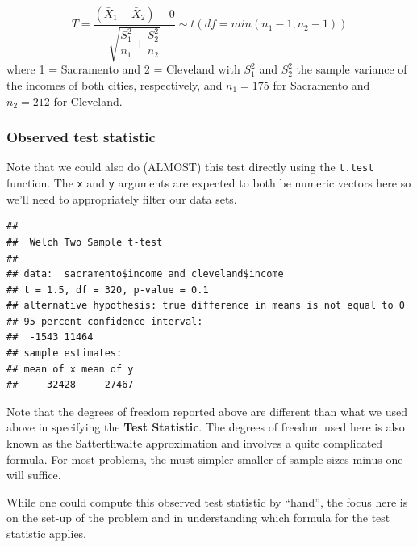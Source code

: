 \documentclass[]{tufte-book}
\newenvironment{Shaded}{\begin{snugshade}}{\end{snugshade}}
\newcommand{\KeywordTok}[1]{\textcolor[rgb]{0.13,0.29,0.53}{\textbf{{#1}}}}
\newcommand{\DataTypeTok}[1]{\textcolor[rgb]{0.13,0.29,0.53}{{#1}}}
\newcommand{\StringTok}[1]{\textcolor[rgb]{0.31,0.60,0.02}{{#1}}}
\newcommand{\NormalTok}[1]{{#1}}
\begin{document}
\[ T =\dfrac{ (\bar{X}_1 - \bar{X}_2) - 0}{ \sqrt{\dfrac{S_1^2}{n_1} + \dfrac{S_2^2}{n_2}}  } \sim t (df = min(n_1 - 1, n_2 - 1)) \]
where 1 = Sacramento and 2 = Cleveland with \(S_1^2\) and \(S_2^2\) the
sample variance of the incomes of both cities, respectively, and
\(n_1 = 175\) for Sacramento and \(n_2 = 212\) for Cleveland.

\subsubsection{Observed test statistic}\label{observed-test-statistic-3}

Note that we could also do (ALMOST) this test directly using the
\texttt{t.test} function. The \texttt{x} and \texttt{y} arguments are
expected to both be numeric vectors here so we'll need to appropriately
filter our data sets.

\begin{Shaded}
\end{Shaded}

\begin{verbatim}
## 
##  Welch Two Sample t-test
## 
## data:  sacramento$income and cleveland$income
## t = 1.5, df = 320, p-value = 0.1
## alternative hypothesis: true difference in means is not equal to 0
## 95 percent confidence interval:
##  -1543 11464
## sample estimates:
## mean of x mean of y 
##     32428     27467
\end{verbatim}

Note that the degrees of freedom reported above are different than what
we used above in specifying the \textbf{Test Statistic}. The degrees of
freedom used here is also known as the Satterthwaite approximation and
involves a quite complicated formula. For most problems, the must
simpler smaller of sample sizes minus one will suffice.

While one could compute this observed test statistic by ``hand'', the
focus here is on the set-up of the problem and in understanding which
formula for the test statistic applies.
\end{document}
